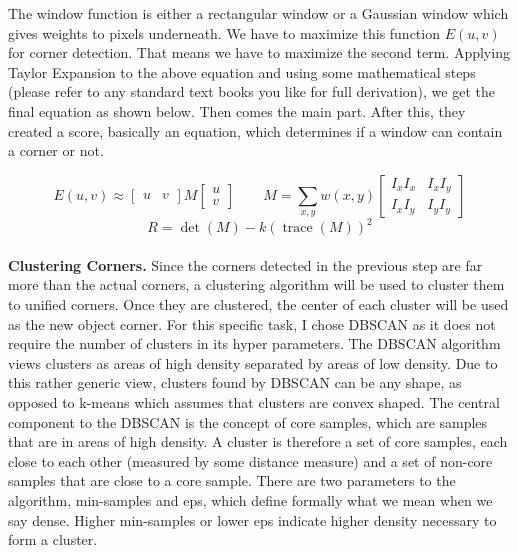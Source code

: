 \documentclass[crop=false]{standalone}
\begin{document}
\noindent The window function is either a rectangular window or a Gaussian window which gives weights to pixels underneath. We have to maximize this function $E(u,v)$ for corner detection. That means we have to maximize the second term. Applying Taylor Expansion to the above equation and using some mathematical steps (please refer to any standard text books you like for full derivation), we get the final equation as shown below. Then comes the main part. After this, they created a score, basically an equation, which determines if a window can contain a corner or not.

$$
E(u,v) \approx \begin{bmatrix} u & v \end{bmatrix} M \begin{bmatrix} u \\ v \end{bmatrix} \qquad M = \sum_{x,y} w(x,y) \begin{bmatrix}I_x I_x & I_x I_y \\ I_x I_y & I_y I_y \end{bmatrix}
$$
$$
R = \det(M) - k(\operatorname{trace}(M))^2
$$
\\
\noindent \textbf{Clustering Corners.} Since the corners detected in the previous step are far more than the actual corners, a clustering algorithm will be used to cluster them to unified corners. Once they are clustered, the center of each cluster will be used as the new object corner. For this specific task, I chose DBSCAN as it does not require the number of clusters in its hyper parameters. The DBSCAN algorithm views clusters as areas of high density separated by areas of low density. Due to this rather generic view, clusters found by DBSCAN can be any shape, as opposed to k-means which assumes that clusters are convex shaped. The central component to the DBSCAN is the concept of core samples, which are samples that are in areas of high density. A cluster is therefore a set of core samples, each close to each other (measured by some distance measure) and a set of non-core samples that are close to a core sample. There are two parameters to the algorithm, min-samples and eps, which define formally what we mean when we say dense. Higher min-samples or lower eps indicate higher density necessary to form a cluster.
\\
\end{document}

